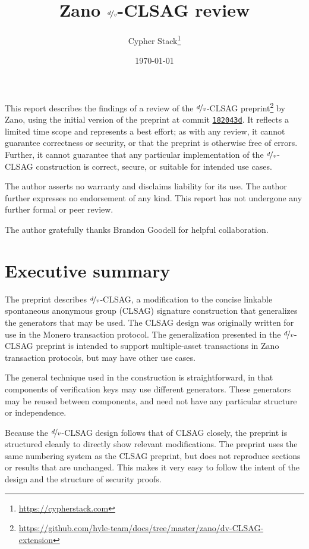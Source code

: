 \documentclass{article}
\title{Zano $\nicefrac{d}{v}$-CLSAG review}
\author{Cypher Stack\thanks{\url{https://cypherstack.com}}}
\date{\today}
\begin{document}
\maketitle

This report describes the findings of a review of the $\nicefrac{d}{v}$-CLSAG preprint\footnote{\url{https://github.com/hyle-team/docs/tree/master/zano/dv-CLSAG-extension}} by Zano, using the initial version of the preprint at commit \href{https://github.com/hyle-team/docs/tree/182043dd497dab8dc66464028b791641e4f7a56e/zano/dv-CLSAG-extension}{\texttt{182043d}}.
It reflects a limited time scope and represents a best effort; as with any review, it cannot guarantee correctness or security, or that the preprint is otherwise free of errors.
Further, it cannot guarantee that any particular implementation of the $\nicefrac{d}{v}$-CLSAG construction is correct, secure, or suitable for intended use cases.

The author asserts no warranty and disclaims liability for its use.
The author further expresses no endorsement of any kind.
This report has not undergone any further formal or peer review.

The author gratefully thanks Brandon Goodell for helpful collaboration.

\tableofcontents


\section{Executive summary}

The preprint describes $\nicefrac{d}{v}$-CLSAG, a modification to the concise linkable spontaneous anonymous group (CLSAG) signature construction \cite{clsag} that generalizes the generators that may be used.
The CLSAG design was originally written for use in the Monero transaction protocol.
The generalization presented in the $\nicefrac{d}{v}$-CLSAG preprint is intended to support multiple-asset transactions in Zano transaction protocols, but may have other use cases.

The general technique used in the construction is straightforward, in that components of verification keys may use different generators.
These generators may be reused between components, and need not have any particular structure or independence.

Because the $\nicefrac{d}{v}$-CLSAG design follows that of CLSAG closely, the preprint is structured cleanly to directly show relevant modifications.
The preprint uses the same numbering system as the CLSAG preprint, but does not reproduce sections or results that are unchanged.
This makes it very easy to follow the intent of the design and the structure of security proofs.
\end{document}
